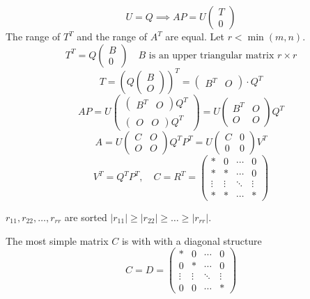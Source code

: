$$ U = Q \implies AP = U \begin{pmatrix} T \\ 0 \end{pmatrix} $$
The range of $T^T$ and the range of $A^T$ are equal. \newline
Let \( r < \min(m, n) \).
\[ T^T = Q \begin{pmatrix} B \\ 0 \end{pmatrix} \quad B \text{ is an upper triangular matrix } r \times r \]
\[ T = \left(Q\begin{pmatrix} B \\ O \end{pmatrix}\right)^T = \begin{pmatrix} B^T & O \end{pmatrix} \cdot Q^T \]
\[ A P = U \begin{pmatrix} \begin{pmatrix} B^T & O \end{pmatrix} Q^T \\ \begin{pmatrix} O & O \end{pmatrix} Q^T \end{pmatrix} = U \begin{pmatrix} B^T & O \\ O & O \end{pmatrix} Q^T \]
\[ A = U \begin{pmatrix} C & O \\ O & O \end{pmatrix} Q^T P^T = U \begin{pmatrix} C & 0 \\ 0 & 0 \end{pmatrix}V^T \]
\[ V^T = Q^T P^T, \quad C = R^T = \begin{pmatrix}
\ast & 0 & \cdots & 0 \\
\ast & \ast & \cdots & 0 \\
\vdots & \vdots & \ddots & \vdots \\
\ast & \ast & \cdots & \ast 
\end{pmatrix}
\]

$r_{11}, r_{22}, \ldots, r_{rr}$ are sorted $|r_{11}| \geq |r_{22}| \geq \ldots \geq |r_{rr}|$.

The most simple matrix $C$ is with with a diagonal structure
\[
C = D = \begin{pmatrix}
    \ast & 0 & \cdots & 0 \\
    0 & \ast & \cdots & 0 \\
    \vdots & \vdots & \ddots & \vdots \\
    0 & 0 & \cdots & \ast 
    \end{pmatrix}
\]

